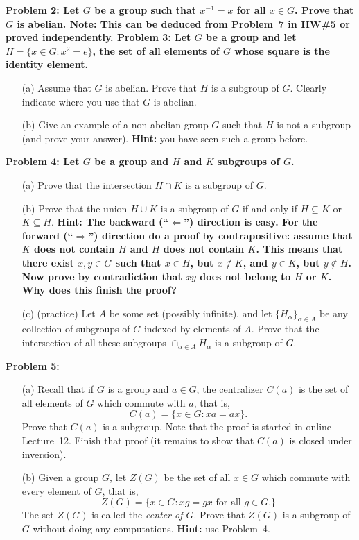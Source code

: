 \documentclass[11pt]{amsart}
\begin{document}
\bf{Problem 2: }\rm Let $G$ be a group such that $x^{-1}=x$ for all $x\in G$.
Prove that $G$ is abelian. {\bf Note:} This can be deduced from Problem~7 in HW\#5
or proved independently.
\skv
\bf{Problem 3: }\rm Let $G$ be a group and let $H=\{x\in G: x^2=e\}$, the set of
all elements of $G$ whose square is the identity element. 
\begin{itemize}
\item[(a)] Assume that $G$ is abelian. Prove that $H$ is a subgroup of $G$.
Clearly indicate where you use that $G$ is abelian. 
\item[(b)] Give an example of a non-abelian group $G$ such that $H$ is not a subgroup
(and prove your answer).
{\bf Hint:} you have seen such a group before.
\end{itemize}
\skv
\bf{Problem 4: }\rm Let $G$ be a group and $H$ and $K$  subgroups of $G$.
\begin{itemize}
\item[(a)] Prove that the intersection $H\cap K$ is a subgroup of $G$.
\item[(b)] Prove that the union $H\cup K$ is a subgroup of $G$ if and only if
$H\subseteq K$ or $K\subseteq H$. \bf{Hint: }\rm The backward (``$\Leftarrow$'')
direction is easy. For the forward (``$\Rightarrow$'') direction
do a proof by contrapositive: assume that $K$ does not contain $H$
and $H$ does not contain $K$. This means that there exist
$x,y\in G$ such that $x\in H$, but $x\not\in K$, and $y\in K$, but $y\not\in H$.
Now prove by contradiction that $xy$ does not belong to $H$ or $K$. Why does
this finish the proof?
\item[(c)] (practice) Let $A$ be some set (possibly infinite), and let 
$\{H_{\alpha}\}_{\alpha\in A}$ be any collection  of subgroups of $G$ 
indexed by elements of $A$. Prove that the intersection of all these subgroups 
$\cap_{\alpha\in A} H_{\alpha}$ is a subgroup of $G$.
\end{itemize}
\bf{Problem 5: }\rm 
\begin{itemize}
\item[(a)] Recall that if $G$ is a group and $a\in G$,
the centralizer $C(a)$ is the set of all elements of $G$ which commute with $a$,
that is,
$$C(a)=\{x\in G : xa=ax\}.$$
Prove that $C(a)$ is a subgroup. Note that the proof is started in online Lecture~12.
Finish that proof (it remains to show that $C(a)$ is closed under inversion).
\item[(b)] Given a group $G$, let $Z(G)$ be the set of all $x\in G$
which commute with every element of $G$, that is,
$$Z(G)=\{x\in G: xg=gx \mbox{ for all } g\in G.\}$$
The set $Z(G)$ is called the {\it center of $G$}.
Prove that $Z(G)$ is a subgroup of $G$ without doing any computations.
{\bf Hint:} use Problem~4.
\end{itemize}
\skv
\end{document}
